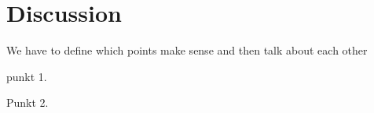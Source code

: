 \chapter{Discussion}
\label{chapter:Discussion}

We have to define which points make sense and then talk about each other


punkt 1.

Punkt 2.


 